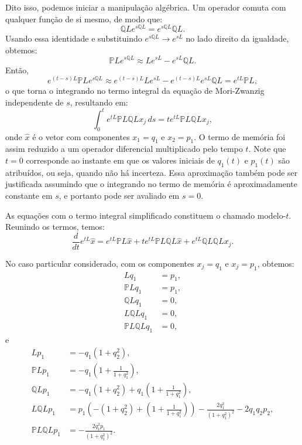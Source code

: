 Dito isso, podemos iniciar a manipulação algébrica. Um operador comuta com qualquer função de si mesmo, de modo que:
\begin{equation*}
	\mathbb{Q}Le^{s\mathbb{Q}L} = e^{s\mathbb{Q}L} \mathbb{Q}L.
\end{equation*}
Usando essa identidade e substituindo $e^{s\mathbb{Q}L} \to e^{sL}$ no lado direito da igualdade, obtemos:
\begin{equation*}
	\mathbb{P}Le^{s\mathbb{Q}L} \approx Le^{sL} - e^{sL} \mathbb{Q}L.
\end{equation*}
Então,
\begin{equation*}
	e^{(t-s)L} \mathbb{P}Le^{s\mathbb{Q}L} \approx e^{(t-s)L} Le^{sL} - e^{(t-s)L} e^{sL} \mathbb{Q}L = e^{tL} \mathbb{P}L,
\end{equation*}
o que torna o integrando no termo integral da equação de Mori-Zwanzig independente de $s$, resultando em:
\begin{equation*}
	\int_0^t e^{tL} \mathbb{P}L \mathbb{Q}L x_j \, ds = t e^{tL} \mathbb{P}L \mathbb{Q}L x_j,
\end{equation*}
onde $\hat{x}$ é o vetor com componentes $x_1 = q_1$ e $x_2 = p_1$. O termo de memória foi assim reduzido a um operador diferencial multiplicado pelo tempo $t$. Note que $t = 0$ corresponde ao instante em que os valores iniciais de $q_1(t)$ e $p_1(t)$ são atribuídos, ou seja, quando não há incerteza. Essa aproximação também pode ser justificada assumindo que o integrando no termo de memória é aproximadamente constante em $s$, e portanto pode ser avaliado em $s = 0$.

As equações com o termo integral simplificado constituem o chamado modelo-$t$. Reunindo os termos, temos:
\begin{equation*}
	\frac{d}{dt} e^{tL} \hat{x} = e^{tL} \mathbb{P}L \hat{x} + t e^{tL} \mathbb{P}L \mathbb{Q}L \hat{x} + e^{tL} \mathbb{Q}L \mathbb{Q}L x_j.
\end{equation*}

No caso particular considerado, com os componentes $x_j = q_1$ e $x_j = p_1$, obtemos:
\begin{align*}
	Lq_1                        & = p_1, \\
	\mathbb{P}Lq_1              & = p_1, \\
	\mathbb{Q}Lq_1              & = 0,   \\
	L\mathbb{Q}Lq_1             & = 0,   \\
	\mathbb{P}L \mathbb{Q}L q_1 & = 0,   
\end{align*}
e
\begin{align*}
	Lp_1 &= -q_1(1 + q_2^2),\\
	\mathbb{P}Lp_1 &= -q_1\left(1 + \frac{1}{1 + q_1^2}\right),\\
	\mathbb{Q}Lp_1 &= -q_1(1 + q_2^2) + q_1\left(1 + \frac{1}{1 + q_1^2}\right),\\
	L\mathbb{Q}Lp_1 &= p_1\left(- (1 + q_2^2) + \left(1 + \frac{1}{1 + q_1^2} \right) \right) - \frac{2q_1^2}{(1 + q_1^2)^2} - 2q_1 q_2 p_2, \\
	\mathbb{P}L\mathbb{Q}Lp_1 & = -\frac{2q_1^2 p_1}{(1 + q_1^2)^2}.
\end{align*}

